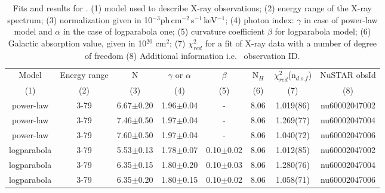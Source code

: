 \begin{table*}

\caption{Fits and results for \one.    (1) model used to describe X-ray observations; (2) energy range of the X-ray spectrum;  (3) normalization given in 10$^{-3}$ph\,cm$^{-2}$\,s$^{-1}$\,keV$^{-1}$; (4) photon index: $\gamma$ in case of power-law model and $\alpha$ in the case of logparabola one; (5) curvature coefficient $\beta$ for logparabola model; (6) Galactic absorption value, given in 10$^{20}$ cm$^2$; (7) $\chi_{red}^2$ for a fit of X-ray data with a number of degree of freedom (8)  Additional information i.e. \nus\ observation ID.}
\label{table:results_0229}

\centering

\begin{tabular}{c|c|c|c|c|c|c|c}
\hline
\hline
  Model  & Energy range & N & $\gamma$ or $\alpha$ & $\beta$  & N$_H$  & $\chi_{red}^2$(n$_{d.o.f}$) &  NuSTAR obsId  \\
(1) &  (2)& (3) & (4) & (5) & (6)  & (7) & (8)    \\
\hline


power-law    &  3-79 &   6.67$\pm$0.20   &   1.96$\pm$0.04   &  -  & 8.06 &   1.019(86)      & nu60002047002\\
power-law    &  3-79 &   7.46$\pm$0.50   &   1.97$\pm$0.04   &  -  & 8.06 &   1.269(77)      & nu60002047004\\
power-law    &  3-79 &   7.60$\pm$0.50   &   1.97$\pm$0.04   &  -  & 8.06 &   1.040(72)      & nu60002047006\\
\hline
logparabola   &  3-79 &   5.53$\pm$0.13   &   1.78$\pm$0.07   &  0.10$\pm$0.02  & 8.06 &   1.012(85)      & nu60002047002\\
logparabola   &  3-79 &   6.35$\pm$0.15   &   1.80$\pm$0.20   &  0.10$\pm$0.03  & 8.06 &   1.280(76)      & nu60002047004\\
logparabola   &  3-79 &   6.35$\pm$0.20   &   1.80$\pm$0.15   &  0.10$\pm$0.02  & 8.06 &   1.058(71)      & nu60002047006\\
\hline



\end{tabular}
\end{table*}
